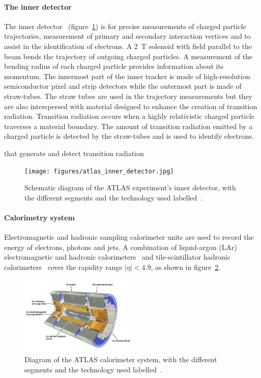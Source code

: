 \paragraph*{The inner detector} \hfill \break
The inner detector~\cite{atlas_inner_detector_tdr_1, atlas_inner_detector_tdr_2} (figure~\ref{fig:atlas_inner_detector}) is for precise measurements of charged particle trajectories, measurement of primary and secondary interaction vertices and to assist in the identification of electrons. A \SI{2}{\tesla} solenoid with field parallel to the beam bends the trajectory of outgoing charged particles. A measurement of the bending radius of each charged particle provides information about its momentum. The innermost part of the inner tracker is made of high-resolution semiconductor pixel and strip detectors while the outermost part is made of straw-tubes. The straw tubes are used in the trajectory measurements but they are also interspersed with material designed to enhance the creation of transition radiation. Transition radiation occurs when a highly relativistic charged particle traverses a material boundary. The amount of transition radiation emitted by a charged particle is detected by the straw-tubes and is used to identify electrons. 

 that generate and detect transition radiation

\begin{figure}
    \centering
    \texttt{[image: figures/atlas\_inner\_detector.jpg]}
    \caption{Schematic diagram of the ATLAS experiment's inner detector, with the different segments and the technology used labelled~\cite{collaboration_atlas_2008}.}
    \label{fig:atlas_inner_detector}
\end{figure}

\paragraph*{Calorimetry system} \hfill \break
Electromagnetic and hadronic sampling calorimeter units are used to record the energy of electrons, photons and jets. A combination of liquid-argon (LAr) electromagnetic and hadronic calorimeters~\cite{atlas_lar_cal_tdr} and tile-scintillator hadronic calorimeters~\cite{atlas_tile_cal_tdr} cover the rapidity range $|\eta| < 4.9$, as shown in figure~\ref{fig:atlas_calorimeter}.

\begin{figure}
    \centering
    \includegraphics[width = 0.5\textwidth]{figures/atlas_calorimeter.png}
    \caption{Diagram of the ATLAS calorimeter system, with the different segments and the technology used labelled~\cite{collaboration_atlas_2008}.}
    \label{fig:atlas_calorimeter}
\end{figure}

